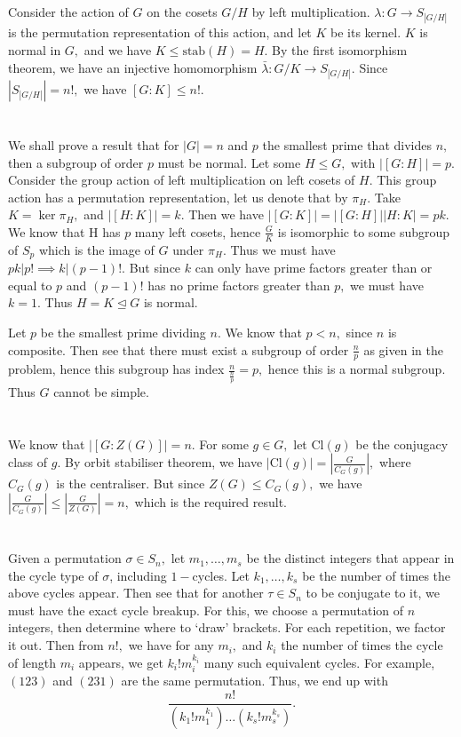 \documentclass{article}
\begin{document}
\section{} %
Consider the action of $G$ on the cosets $G/H$ by left multiplication. $\lambda: G \to S_{|G/H|}$ is the permutation representation of this action, and let 
$K$ be its kernel. $K$ is normal in $G,$ and we have $K \leq \text{stab}(H)=H.$ By the first isomorphism theorem, we have an injective homomorphism 
$\bar{\lambda}: G/K \to S_{|G/H|}.$ Since $|S_{|G/H|}|=n!,$ we have $[G:K] \leq n!.$
\section{} %
We shall prove a result that for $|G| =n$ and $p$ the smallest prime that divides $n,$ then a subgroup of order $p$ must be normal.
Let some $H \leq G,$ with $|[G:H]|=p.$ Consider the group action of left multiplication on left cosets of $H.$ This group action has a permutation 
representation, let us denote that by $\pi_H.$ Take $K=\ker \pi_H,$ and $|[H:K]| =k.$ 
Then we have $|[G:K]|=|[G:H]||H:K|=pk.$ We know that H has $p$ many left cosets, hence $\frac{G}{K}$ is isomorphic to some subgroup of $S_p$ which is the 
image of $G$ under $ \pi_H.$ Thus we must have $pk|p! \implies k|(p-1)!.$ But since $k$ can only have prime factors greater than or equal to $p$ and 
$(p-1)!$ has no prime factors greater than $p,$ we must have $k=1.$ Thus $H=K \trianglelefteq G$ is normal.
 
Let $p$ be the smallest prime dividing $n.$ We know that $p < n,$ since $n$ is composite. Then see that there must exist a subgroup of order $\frac{n}{p}$ 
as given in the problem, hence this subgroup has index $\frac{n}{\frac{n}{p}}=p,$ hence this is a normal subgroup. Thus $G$ cannot be simple. 
\section{} %
We know that $|[G:Z(G)]| =n.$ For some $g \in G,$ let $\text{Cl}(g)$ be the conjugacy class of $g.$ By orbit stabiliser theorem, we have $|\text{Cl}(g)| 
=\left|\frac{G}{C_{G}(g)}\right|,$ where $C_G(g)$ is the centraliser. But since $Z(G) \leq C_G(g),$ we have $\left|\frac{G}{C_{G}(g)}\right| \leq 
\left|\frac{G}{Z(G)}\right|=n, $ which is the required result.
\section{} %
Given a permutation $\sigma \in S_n,$ let $m_1,\dots, m_s$ be the distinct integers that appear in the cycle type of $\sigma $, including $1-$cycles. Let 
$k_1,\dots,k_s$ be the number of times the above cycles appear. Then see that for another $\tau \in S_{n}$ to be conjugate to it, we must have the exact 
cycle breakup. For this, we choose a permutation of $n$ integers, then determine where to `draw' brackets. For each repetition, we factor it out. Then from 
$n!,$ we have for any $m_i,$ and $k_i$ the number of times the cycle of length $m_i$ appears, we get $k_i!m_i^{k_i}$ many such equivalent cycles. For 
example, $(1 2 3)$ and $(2 3 1)$ are the same permutation. Thus, we end up with $$ \frac{n!}{(k_1!m_1^{k_1})\dots (k_s!m_s^{k_s})}.$$
\end{document}
